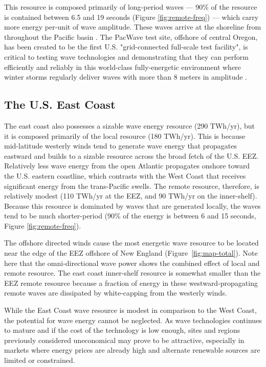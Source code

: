 This resource is composed primarily of long-period waves — 90\% of the resource is contained between 6.5 and 19 seconds (Figure \ref{fig:remote-freq}) — which carry more energy per-unit of wave amplitude. These waves arrive at the shoreline from throughout the Pacific basin \citep{perezESTELAMethodEvaluating2014}. The PacWave test site, offshore of central Oregon, has been created to be the first U.S. "grid-connected full-scale test facility", is critical to testing wave technologies and demonstrating that they can perform efficiently and reliably in this world-class fully-energetic environment where winter storms regularly deliver waves with more than 8 meters in amplitude \citep[e.g.][]{allan_climate_2006}.


\subsection{The U.S. East Coast}

The east coast also possesses a sizable wave energy resource (290 TWh/yr), but it is composed primarily of the local resource (180 TWh/yr). This is because mid-latitude westerly winds tend to generate wave energy that propagates eastward and builds to a sizable resource across the broad fetch of the U.S. EEZ. Relatively less wave energy from the open Atlantic propagates onshore toward the U.S. eastern coastline, which contrasts with the West Coast that receives significant energy from the trans-Pacific swells. The remote resource, therefore, is relatively modest (110 TWh/yr at the EEZ, and 90 TWh/yr on the inner-shelf). Because this resource is dominated by waves that are generated locally, the waves tend to be much shorter-period (90\% of the energy is between 6 and 15 seconds, Figure \ref{fig:remote-freq}).

The offshore directed winds cause the most energetic wave resource to be located near the edge of the EEZ offshore of New England (Figure~\ref{fig:map-total}). Note here that the omni-directional wave power shows the combined effect of local and remote resource. The east coast inner-shelf resource is somewhat smaller than the EEZ remote resource because a fraction of energy in these westward-propagating remote waves are dissipated by white-capping from the westerly winds.

While the East Coast wave resource is modest in comparison to the West Coast, the potential for wave energy cannot be neglected. As wave technologies continues to mature and if the cost of the technology is low enough, sites and regions previously considered uneconomical may prove to be attractive, especially in markets where energy prices are already high and alternate renewable sources are limited or constrained. 

